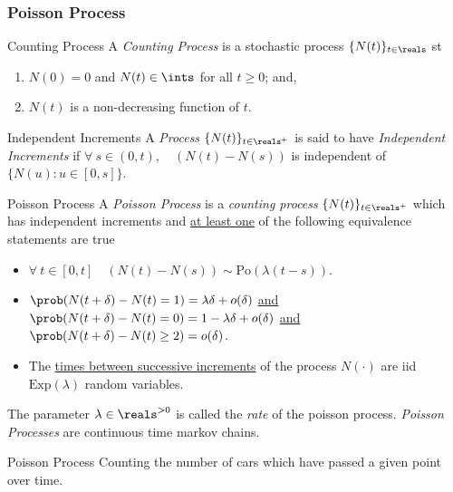 \documentclass[11pt,a4paper]{article}
\begin{document}
\subsubsection{Poisson Process}

  \begin{definition}{Counting Process}
    A \textit{Counting Process} is a stochastic process $\{N(t)\}_{t\in\reals}$ st
    \begin{enumerate}
      \item $N(0)=0$ and $N(t)\in\ints$ for all $t\geq0$; and,
      \item $N(t)$ is a non-decreasing function of $t$.
    \end{enumerate}
  \end{definition}

  \begin{definition}{Independent Increments}
    A \textit{Process} $\{N(t)\}_{t\in\reals^+}$ is said to have \textit{Independent Increments} if $\forall\ s\in(0,t),\quad(N(t)-N(s))$ is independent of $\{N(u):u\in[0,s]\}$.
  \end{definition}

  \begin{definition}{Poisson Process}
    A \textit{Poisson Process} is a \textit{counting process} $\{N(t)\}_{t\in\reals^+}$ which has independent increments and \underline{at least one} of the following equivalence statements are true
    \begin{itemize}
      \item $\forall\ t\in[0,t]\quad(N(t)-N(s))\sim\text{Po}(\lambda(t-s))$.
      \item $\prob(N(t+\delta)-N(t)=1)=\lambda\delta+o(\delta)$ \underline{and}\\
      $\prob(N(t+\delta)-N(t)=0)=1-\lambda\delta+o(\delta)$ \underline{and}\\
      $\prob(N(t+\delta)-N(t)\geq2)=o(\delta)$.
      \item The \underline{times between successive increments} of the process $N(\cdot)$ are iid $\text{Exp}(\lambda)$ random variables.
    \end{itemize}
    The parameter $\lambda\in\reals^{>0}$ is called the \textit{rate} of the poisson process. \textit{Poisson Processes} are continuous time markov chains.
  \end{definition}

  \begin{example}{Poisson Process}
    Counting the number of cars which have passed a given point over time.
  \end{example}
\end{document}
